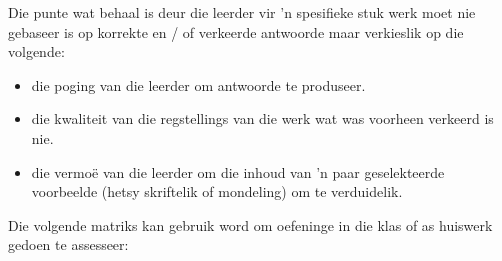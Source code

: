 Die punte wat behaal is deur die leerder vir 'n spesifieke stuk werk moet nie gebaseer is op korrekte en / of verkeerde antwoorde maar verkieslik op die volgende:

\begin{itemize}[noitemsep]
\item
  die poging van die leerder om antwoorde te produseer.
\item
  die kwaliteit van die regstellings van die werk wat was voorheen verkeerd is nie.
\item
  die vermo\"{e} van die leerder om die inhoud van 'n paar geselekteerde voorbeelde (hetsy skriftelik of mondeling) om te verduidelik.
\end{itemize}
Die volgende matriks kan gebruik word om oefeninge in die klas of as huiswerk gedoen te assesseer:

